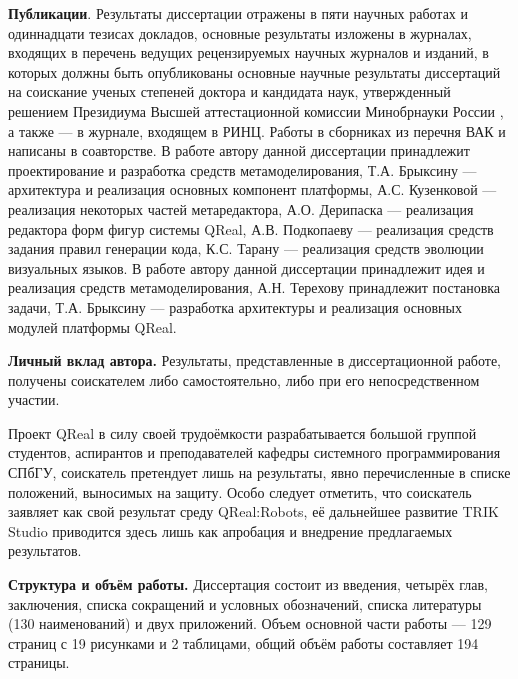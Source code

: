 \textbf{Публикации}. Результаты диссертации отражены в пяти научных работах и одиннадцати тезисах докладов, 
основные результаты изложены в журналах, входящих в перечень ведущих рецензируемых научных 
журналов и изданий, в которых должны быть опубликованы основные научные результаты диссертаций 
на соискание ученых степеней доктора и кандидата наук, утвержденный решением Президиума 
Высшей аттестационной комиссии Минобрнауки России ,
а также \cite{terekhov2009architecture, osechkina2010gestures} --- в журнале, входящем в РИНЦ. 
Работы в сборниках из перечня ВАК  и 
написаны в соавторстве. В работе  автору данной диссертации 
принадлежит проектирование и разработка средств метамоделирования, Т.А. Брыксину --- архитектура и реализация основных
компонент платформы, А.С. Кузенковой --- реализация некоторых частей метаредактора, А.О. Дерипаска
--- реализация редактора форм фигур системы QReal, А.В. Подкопаеву --- реализация средств задания правил генерации кода,
К.С. Тарану --- реализация средств эволюции визуальных языков. В работе 
автору данной диссертации принадлежит идея и реализация средств метамоделирования, А.Н. Терехову 
принадлежит постановка задачи, Т.А. Брыксину --- разработка архитектуры и реализация основных модулей платформы QReal.

\textbf{Личный вклад автора.} Результаты, представленные в диссертационной работе, получены 
соискателем либо самостоятельно, либо при его непосредственном участии.

Проект QReal в силу своей трудоёмкости разрабатывается большой группой студентов, аспирантов
и преподавателей кафедры системного программирования СПбГУ, соискатель претендует лишь на
результаты, явно перечисленные в списке положений, выносимых на защиту. Особо следует отметить,
что соискатель заявляет как свой результат среду QReal:Robots, её дальнейшее развитие 
TRIK Studio приводится здесь лишь как апробация и внедрение предлагаемых результатов.

\textbf{Структура и объём работы.} Диссертация состоит из введения, четырёх глав, заключения, 
списка сокращений и условных обозначений, списка литературы (130 наименований) и двух 
приложений. Объем основной части работы --- 129 страниц с 19 рисунками и 2 таблицами, 
общий объём работы составляет 194 страницы.

